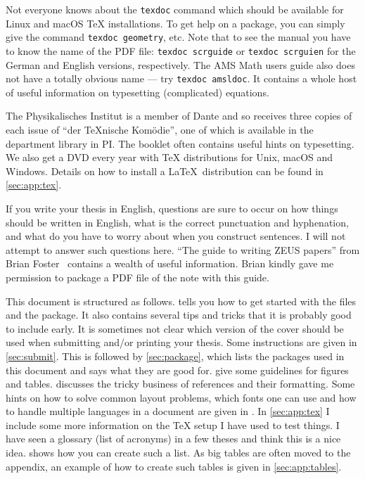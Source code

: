 Not everyone knows about the \texttt{texdoc} command
which should be available for Linux and macOS \TeX{} installations. To get help
on a package, you can simply give the command \texttt{texdoc
  geometry}, etc. Note that to see the \KOMAScript{} manual you have
to know the name of the PDF file: \texttt{texdoc scrguide} or
\texttt{texdoc scrguien} for the German and English versions,
respectively. The AMS Math users guide also does not have a totally
obvious name --- try \texttt{texdoc amsldoc}. It
contains a whole host of useful information on typesetting
(complicated) equations.

The Physikalisches Institut is a member of Dante and so receives three
copies of each issue of \foreignquote{ngerman}{der TeXnische Komödie},
one of which is available in the department library in PI\@.
The booklet often contains useful hints on typesetting. We also get a DVD
every year with \TeX{}
distributions for Unix, macOS and Windows. Details on how to install
a \LaTeX\ distribution can be found in \cref{sec:app:tex}.

If you write your thesis in English, questions are sure
to occur on how things should be written in English, what is the
correct punctuation and hyphenation, and what do you have to worry
about when you construct sentences. I will not attempt to answer such
questions here. \enquote{The guide to writing ZEUS
  papers} from Brian Foster~\cite{ZEUSGuide}
contains a wealth of useful information. Brian kindly gave me
permission to package a PDF file of the note with this guide.

This document is structured as follows.  tells
you how to get started with the files and the package. It also contains
several tips and tricks that it is probably good to include early. It
is sometimes not clear which version of the cover should be used when
submitting and/or printing your thesis. Some instructions are given in
\cref{sec:submit}. 
This is followed by \cref{sec:package}, which lists the packages used in this
document and says what they are good for. 
 give some guidelines for figures and tables.
 discusses the tricky business of references and their formatting.
Some hints on how to solve common
layout problems, which fonts one can use and how to handle multiple
languages in a document are given in . 
In \cref{sec:app:tex} I include some more
information on the \TeX{} setup I have used to test things.
I have seen a glossary (list of acronyms) in a few theses
and think this is a nice idea.
 shows how you can create such a list.
As big tables are often moved to the appendix, an example of how to create
such tables is given in \cref{sec:app:tables}.

